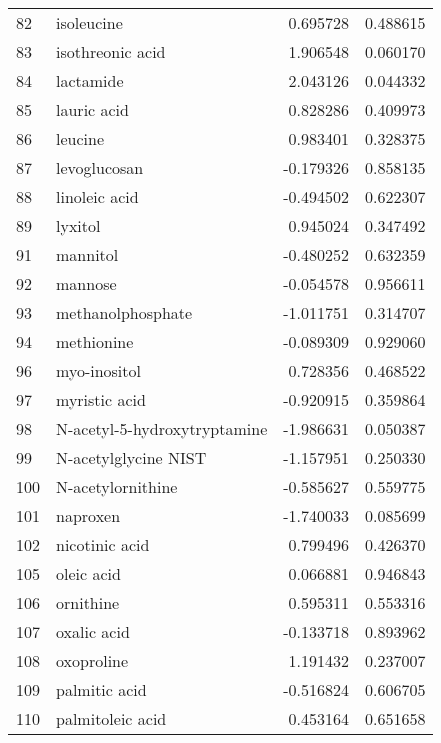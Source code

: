 \begin{tabular}{llrr}
82  &                         isoleucine &  0.695728 &  0.488615 \\
83  &                   isothreonic acid &  1.906548 &  0.060170 \\
84  &                          lactamide &  2.043126 &  0.044332 \\
85  &                        lauric acid &  0.828286 &  0.409973 \\
86  &                            leucine &  0.983401 &  0.328375 \\
87  &                       levoglucosan & -0.179326 &  0.858135 \\
88  &                      linoleic acid & -0.494502 &  0.622307 \\
89  &                            lyxitol &  0.945024 &  0.347492 \\
91  &                           mannitol & -0.480252 &  0.632359 \\
92  &                            mannose & -0.054578 &  0.956611 \\
93  &                  methanolphosphate & -1.011751 &  0.314707 \\
94  &                         methionine & -0.089309 &  0.929060 \\
96  &                       myo-inositol &  0.728356 &  0.468522 \\
97  &                      myristic acid & -0.920915 &  0.359864 \\
98  &       N-acetyl-5-hydroxytryptamine & -1.986631 &  0.050387 \\
99  &               N-acetylglycine NIST & -1.157951 &  0.250330 \\
100 &                  N-acetylornithine & -0.585627 &  0.559775 \\
101 &                           naproxen & -1.740033 &  0.085699 \\
102 &                     nicotinic acid &  0.799496 &  0.426370 \\
105 &                         oleic acid &  0.066881 &  0.946843 \\
106 &                          ornithine &  0.595311 &  0.553316 \\
107 &                        oxalic acid & -0.133718 &  0.893962 \\
108 &                         oxoproline &  1.191432 &  0.237007 \\
109 &                      palmitic acid & -0.516824 &  0.606705 \\
110 &                   palmitoleic acid &  0.453164 &  0.651658 \\

\end{tabular}

